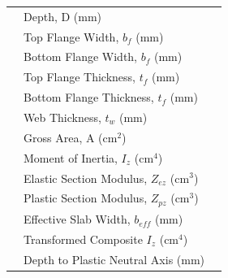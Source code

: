 \documentclass[12pt,a4paper]{report}
\numberwithin{table}{chapter}
\numberwithin{figure}{chapter}
\newcommand{\reportrowpad}{4pt}
\begin{document}
\begin{longtable}{|C{2.5cm}|L{8.0cm}|>{\centering\arraybackslash}p{5.0cm}|}
\hline
{} & \textnormal{Depth, D (mm)} &  \\[\reportrowpad]
 & \textnormal{Top Flange Width, $b_f$ (mm)} &  \\[\reportrowpad]
 & \textnormal{Bottom Flange Width, $b_f$ (mm)} &  \\[\reportrowpad]
 & \textnormal{Top Flange Thickness, $t_f$ (mm)} &  \\[\reportrowpad]
 & \textnormal{Bottom Flange Thickness, $t_f$ (mm)} &  \\[\reportrowpad]
 & \textnormal{Web Thickness, $t_w$ (mm)} &  \\[\reportrowpad]
 & \textnormal{Gross Area, A (cm$^2$)} &  \\[\reportrowpad]
 & \textnormal{Moment of Inertia, $I_z$ (cm$^4$)} &  \\[\reportrowpad]
 & \textnormal{Elastic Section Modulus, $Z_{ez}$ (cm$^3$)} &  \\[\reportrowpad]
 & \textnormal{Plastic Section Modulus, $Z_{pz}$ (cm$^3$)} &  \\[\reportrowpad]
 & \textnormal{Effective Slab Width, $b_{eff}$ (mm)} &  \\[\reportrowpad]
 & \textnormal{Transformed Composite $I_z$ (cm$^4$)} &  \\[\reportrowpad]
 & \textnormal{Depth to Plastic Neutral Axis (mm)} &  \\[\reportrowpad]
\hline
\end{longtable}
\end{document}
